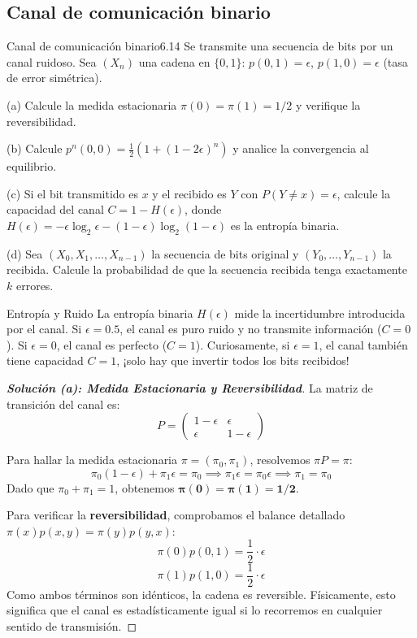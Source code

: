 \documentclass[10pt,a4paper]{article}
\begin{document}
\newpage


\subsection{Canal de comunicación binario}



\begin{ejercicio}{Canal de comunicación binario}{6.14}
    Se transmite una secuencia de bits por un canal ruidoso. Sea $(X_n)$ una cadena en $\{0, 1\}$: $p(0, 1) = \epsilon$, $p(1, 0) = \epsilon$ (tasa de error simétrica).
    
    (a) Calcule la medida estacionaria $\pi(0) = \pi(1) = 1/2$ y verifique la reversibilidad.
    
    (b) Calcule $p^n(0, 0) = \frac{1}{2}(1 + (1 - 2\epsilon)^n)$ y analice la convergencia al equilibrio.
    
    (c) Si el bit transmitido es $x$ y el recibido es $Y$ con $P(Y \neq x) = \epsilon$, calcule la capacidad del canal $C = 1 - H(\epsilon)$, donde $H(\epsilon) = -\epsilon \log_2 \epsilon - (1 - \epsilon) \log_2 (1 - \epsilon)$ es la entropía binaria.
    
    (d) Sea $(X_0, X_1, \dots, X_{n-1})$ la secuencia de bits original y $(Y_0, \dots, Y_{n-1})$ la recibida. Calcule la probabilidad de que la secuencia recibida tenga exactamente $k$ errores.
\end{ejercicio}

\vspace{2mm}

\begin{nota}{Entropía y Ruido}
    La entropía binaria $H(\epsilon)$ mide la incertidumbre introducida por el canal. Si $\epsilon = 0.5$, el canal es puro ruido y no transmite información ($C=0$). Si $\epsilon = 0$, el canal es perfecto ($C=1$). Curiosamente, si $\epsilon = 1$, el canal también tiene capacidad $C=1$, ¡solo hay que invertir todos los bits recibidos!
\end{nota}

\begin{proof}[\textbf{Solución (a): Medida Estacionaria y Reversibilidad}]
    La matriz de transición del canal es:
    \[ P = \begin{pmatrix} 1-\epsilon & \epsilon \\ \epsilon & 1-\epsilon \end{pmatrix} \]
    
    Para hallar la medida estacionaria $\pi = (\pi_0, \pi_1)$, resolvemos $\pi P = \pi$:
    \[ \pi_0(1-\epsilon) + \pi_1\epsilon = \pi_0 \implies \pi_1\epsilon = \pi_0\epsilon \implies \pi_1 = \pi_0 \]
    Dado que $\pi_0 + \pi_1 = 1$, obtenemos $\mathbf{\pi(0) = \pi(1) = 1/2}$.
    
    Para verificar la \textbf{reversibilidad}, comprobamos el balance detallado $\pi(x)p(x,y) = \pi(y)p(y,x)$:
    \[ \pi(0)p(0,1) = \frac{1}{2} \cdot \epsilon \]
    \[ \pi(1)p(1,0) = \frac{1}{2} \cdot \epsilon \]
    Como ambos términos son idénticos, la cadena es reversible. Físicamente, esto significa que el canal es estadísticamente igual si lo recorremos en cualquier sentido de transmisión.
\end{proof}
\end{document}
